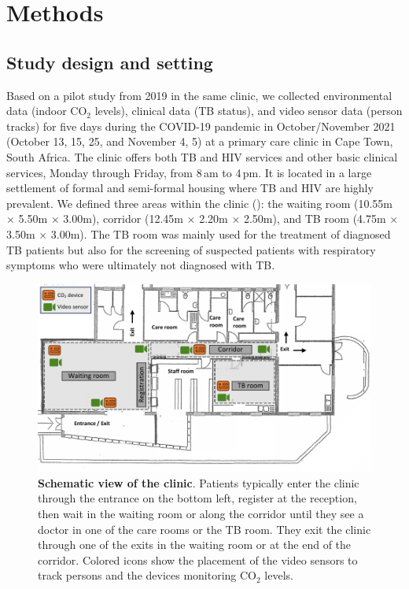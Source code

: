 \documentclass[fleqn,11pt]{wlscirep}
\begin{document}
\newpage

\section*{Methods}

\subsection*{Study design and setting}

Based on a pilot study from 2019 in the same clinic\cite{Zurcher2022JID,Zurcher2020BMJ}, we collected environmental data (indoor CO$_2$ levels), clinical data (TB status), and video sensor data (person tracks) for five days during the COVID-19 pandemic in October/November 2021 (October 13, 15, 25, and November 4, 5) at a primary care clinic in Cape Town, South Africa. The clinic offers both TB and HIV services and other basic clinical services, Monday through Friday, from 8\,am to 4\,pm. It is located in a large settlement of formal and semi-formal housing where TB and HIV are highly prevalent\cite{Wood2007AMJRCCD,Middelkoop2011JAIDS}. We defined three areas within the clinic (): the waiting room (10.55m $\times$ 5.50m $\times$ 3.00m), corridor (12.45m $\times$ 2.20m $\times$ 2.50m), and TB room (4.75m $\times$ 3.50m $\times$ 3.00m). The TB room was mainly used for the treatment of diagnosed TB patients but also for the screening of suspected patients with respiratory symptoms who were ultimately not diagnosed with TB.

\begin{figure}[!htpb]
    \centering
    \includegraphics{doc/clinic-schematic-annotated-view.pdf}
    \caption{\textbf{Schematic view of the clinic}. Patients typically enter the clinic through the entrance on the bottom left, register at the reception, then wait in the waiting room or along the corridor until they see a doctor in one of the care rooms or the TB room. They exit the clinic through one of the exits in the waiting room or at the end of the corridor. Colored icons show the placement of the video sensors to track persons and the devices monitoring CO$_2$ levels.}
    \label{fig:floor-plan}
\end{figure}
\end{document}
